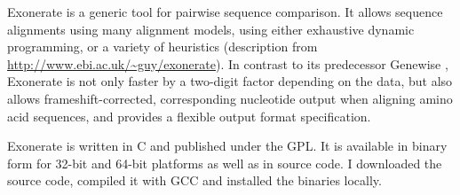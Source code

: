 Exonerate \citep{slater2005} is a generic tool for pairwise sequence comparison.
It allows sequence alignments using many alignment models, using either
exhaustive dynamic programming, or a variety of heuristics (description from
\url{http://www.ebi.ac.uk/~guy/exonerate}). In contrast to its predecessor
Genewise \citep{birney2004}, Exonerate is not only faster by a two-digit factor
depending on the data, but also allows frameshift-corrected, corresponding
nucleotide output when aligning amino acid sequences, and provides a flexible
output format specification.

Exonerate is written in C and published under the GPL. It is available in binary
form for 32-bit and 64-bit platforms as well as in source code. I downloaded the
source code, compiled it with GCC and installed the binaries locally.
